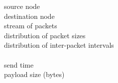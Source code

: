 \hspace*{1ex}\raisebox{1.5pt}{$\centerdot$}~source node\\
\hspace*{1ex}\raisebox{1.5pt}{$\centerdot$}~destination node\\
\hspace*{1ex}\raisebox{1.5pt}{$\centerdot$}~stream of packets\\
\hspace*{1ex}\raisebox{1.5pt}{$\centerdot$}~distribution of packet sizes\\
\hspace*{1ex}\raisebox{1.5pt}{$\centerdot$}~distribution of inter-packet intervals\\
\textbf{}\\
\hspace*{1ex}\raisebox{1.5pt}{$\centerdot$}~send time\\
\hspace*{1ex}\raisebox{1.5pt}{$\centerdot$}~payload size (bytes)\\

